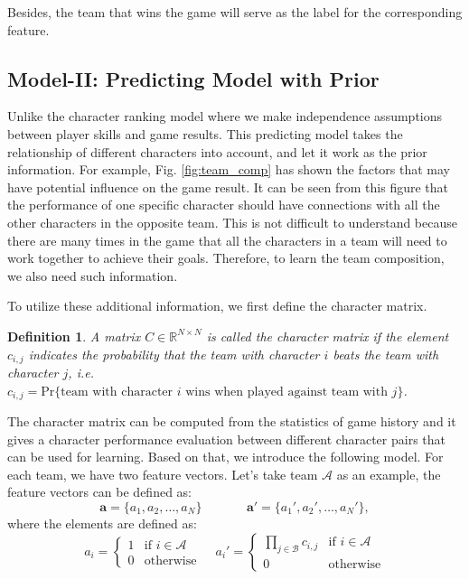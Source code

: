 \documentclass{article} %
\newtheorem{definition}{Definition}
\begin{document}
Besides, the team that wins the game will serve as the label for the corresponding feature.


\subsection{Model-II: Predicting Model with Prior}


Unlike the character ranking model where we make independence assumptions between
player skills and game results. This predicting model takes the relationship of different characters into account, and let it work as the prior information. For example, Fig. \ref{fig:team_comp} has shown the factors that may have potential influence on the game result. It can be seen from this figure that the performance of one specific character should have connections with all the other characters in the opposite team. This is not difficult to understand because there are many times in the game that all the characters in a team will need to work together to achieve their goals. Therefore, to learn the team composition, we also need such information.

To utilize these additional information, we first define the character matrix.
\begin{definition}
A matrix $C \in \mathbb{R}^{N\times N}$ is called the character matrix if the element $c_{i,j}$ indicates the probability that the team with character $i$ beats the team with character $j$, i.e. $c_{i,j}=\text{Pr}\{\text{team with character $i$ wins when played against team with $j$}\}$.
\end{definition}

The character matrix can be computed from the statistics of game history and it gives a character performance evaluation between different character pairs that can be used for learning. Based on that, we introduce the following model. For each team, we have two feature vectors. Let's take team $\mathcal{A}$ as an example, the feature vectors can be defined as:
\begin{equation}
\mathbf{a}=\{a_1,a_2,\ldots,a_N\} \ \ \ \ \ \ \ \ \ \ \ \ \ \ \ \
\mathbf{a'}=\{a_1',a_2',\ldots,a_N'\},
\end{equation}
where the elements are defined as:
\begin{equation}
a_i =
\begin{cases}
1 & \text{if $i\in\mathcal{A}$}\\
0 & \text{otherwise}
\end{cases}\ \ \ \ \
a_i' =
\begin{cases}
\prod_{j\in \mathcal{B}} c_{i,j} & \text{if $i\in\mathcal{A}$} \\
0 & \text{otherwise}
\end{cases}
\end{equation}
\end{document}
